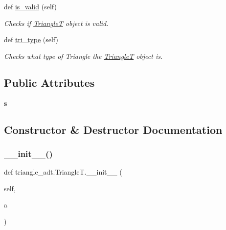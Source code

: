 \begin{DoxyCompactItemize}
def \hyperlink{classtriangle__adt_1_1_triangle_t_a2edd73d4eb4aedae932161c1befb5c63}{is\+\_\+valid} (self)
\begin{DoxyCompactList}\small\item\em Checks if \hyperlink{classtriangle__adt_1_1_triangle_t}{TriangleT} object is valid. \end{DoxyCompactList}\item 
def \hyperlink{classtriangle__adt_1_1_triangle_t_af33c895ca41f21cfc6441af8192a7998}{tri\+\_\+type} (self)
\begin{DoxyCompactList}\small\item\em Checks what type of Triangle the \hyperlink{classtriangle__adt_1_1_triangle_t}{TriangleT} object is. \end{DoxyCompactList}\end{DoxyCompactItemize}
\subsection*{Public Attributes}
\begin{DoxyCompactItemize}
\item 
\mbox{\label{classtriangle__adt_1_1_triangle_t_a678fbcb3fdd76f4787bc3d8a437fc84f}} 
{\bfseries s}
\end{DoxyCompactItemize}


\subsection{Constructor \& Destructor Documentation}
\mbox{\label{classtriangle__adt_1_1_triangle_t_a9837232c07fac634ba677a44fc3fee96}} 
\subsubsection{\texorpdfstring{\+\_\+\+\_\+init\+\_\+\+\_\+()}{\_\_init\_\_()}}
{\footnotesize\ttfamily def triangle\+\_\+adt.\+Triangle\+T.\+\_\+\+\_\+init\+\_\+\+\_\+ (\begin{DoxyParamCaption}\item[{}]{self,  }\item[{}]{a }\end{DoxyParamCaption})}



